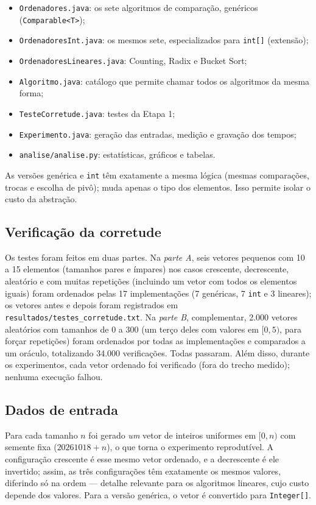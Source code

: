 \documentclass[11pt,a4paper]{article}
\begin{document}
\begin{itemize}
  \item \texttt{Ordenadores.java}: os sete algoritmos de comparação, genéricos (\texttt{Comparable<T>});
  \item \texttt{OrdenadoresInt.java}: os mesmos sete, especializados para \texttt{int[]} (extensão);
  \item \texttt{OrdenadoresLineares.java}: Counting, Radix e Bucket Sort;
  \item \texttt{Algoritmo.java}: catálogo que permite chamar todos os algoritmos da mesma forma;
  \item \texttt{TesteCorretude.java}: testes da Etapa 1;
  \item \texttt{Experimento.java}: geração das entradas, medição e gravação dos tempos;
  \item \texttt{analise/analise.py}: estatísticas, gráficos e tabelas.
\end{itemize}

As versões genérica e \texttt{int} têm exatamente a mesma lógica (mesmas comparações, trocas e
escolha de pivô); muda apenas o tipo dos elementos. Isso permite isolar o custo da abstração.

\subsection{Verificação da corretude}

Os testes foram feitos em duas partes. Na \emph{parte A}, seis vetores pequenos com 10 a 15
elementos (tamanhos pares e ímpares) nos casos crescente, decrescente, aleatório e com muitas
repetições (incluindo um vetor com todos os elementos iguais) foram ordenados pelas 17
implementações (7 genéricas, 7 \texttt{int} e 3 lineares); os vetores antes e depois foram
registrados em \texttt{resultados/testes\_corretude.txt}. Na \emph{parte B}, complementar, 2.000
vetores aleatórios com tamanhos de 0 a 300 (um terço deles com valores em $[0,5)$, para forçar
repetições) foram ordenados por todas as implementações e comparados a um oráculo, totalizando
34.000 verificações. Todas passaram. Além disso, durante os experimentos, cada vetor ordenado foi
verificado (fora do trecho medido); nenhuma execução falhou.

\subsection{Dados de entrada}

Para cada tamanho $n$ foi gerado \emph{um} vetor de inteiros uniformes em $[0,n)$ com semente fixa
($20261018 + n$), o que torna o experimento reprodutível. A configuração crescente é esse mesmo
vetor ordenado, e a decrescente é ele invertido; assim, as três configurações têm exatamente os
mesmos valores, diferindo só na ordem --- detalhe relevante para os algoritmos lineares, cujo
custo depende dos valores. Para a versão genérica, o vetor é convertido para \texttt{Integer[]}.
\end{document}
